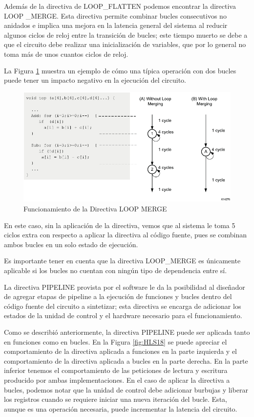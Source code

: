 Además de la directiva de LOOP\_FLATTEN podemos encontrar la directiva LOOP \_MERGE. Esta directiva permite combinar bucles consecutivos no anidados e implica una mejora en la latencia general del sistema al reducir algunos ciclos de reloj entre la transición de bucles; este tiempo muerto se debe a que el circuito debe realizar una inicialización de variables, que por lo general no toma más de unos cuantos ciclos de reloj.

La Figura \ref{fig:HLS17} muestra un ejemplo de cómo una típica operación con dos bucles puede tener un impacto negativo en la ejecución del circuito.

\begin{figure}[H]
  \centering
    \includegraphics[scale=0.8]{./Figures/HLS17.pdf}
  \caption{Funcionamiento de la Directiva LOOP MERGE \citep{HLS2015}}
  \label{fig:HLS17}
\end{figure}

En este caso, sin la aplicación de la directiva, vemos que al sistema le toma 5 ciclos extra con respecto a aplicar la directiva al código fuente, pues se combinan ambos bucles en un solo estado de ejecución.

Es importante tener en cuenta que la directiva LOOP\_MERGE es únicamente aplicable si los bucles no cuentan con ningún tipo de dependencia entre sí.

La directiva PIPELINE provista por el software le da la posibilidad al diseñador de agregar etapas de pipeline a la ejecución de funciones y bucles dentro del código fuente del circuito a sintetizar; esta directiva se encarga de adicionar los estados de la unidad de control y el hardware necesario para el funcionamiento.

Como se describió anteriormente, la directiva PIPELINE puede ser aplicada tanto en funciones como en bucles. En la Figura \ref{fig:HLS18} se puede apreciar el comportamiento de la directiva aplicada a funciones en la parte izquierda y el comportamiento de la directiva aplicada a bucles en la parte derecha. En la parte inferior tenemos el comportamiento de las peticiones de lectura y escritura producido por ambas implementaciones. En el caso de aplicar la directiva a bucles, podemos notar que la unidad de control debe adicionar burbujas y liberar los registros cuando se requiere iniciar una nueva iteración del bucle. Esta, aunque es una operación necesaria, puede incrementar la latencia del circuito.

